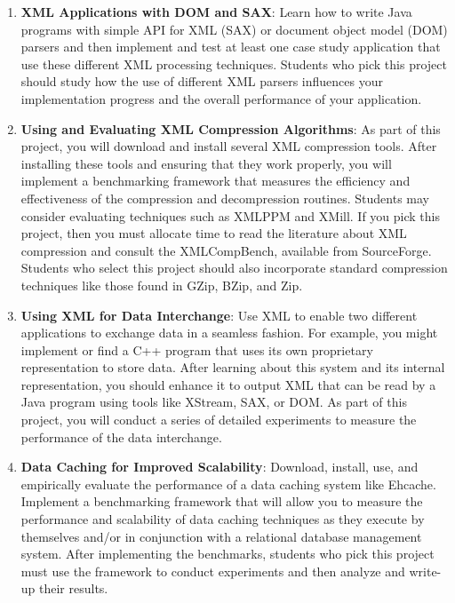 \begin{enumerate}
  \item {\bf XML Applications with DOM and SAX}: Learn how to write Java programs with simple API for XML (SAX) or
    document object model (DOM) parsers and then implement and test at least one case study application that use these
    different XML processing techniques.  Students who pick this project should study how the use of different XML
    parsers influences your implementation progress and the overall performance of your application.  

  \item {\bf Using and Evaluating XML Compression Algorithms}: As part of this project, you will download and install
    several XML compression tools.  After installing these tools and ensuring that they work properly, you will
    implement a benchmarking framework that measures the efficiency and effectiveness of the compression and
    decompression routines.  Students may consider evaluating techniques such as XMLPPM and XMill. If you pick this
    project, then you must allocate time to read the literature about XML compression and consult the XMLCompBench,
    available from SourceForge.  Students who select this project should also incorporate standard compression
    techniques like those found in GZip, BZip, and Zip.

  \item {\bf Using XML for Data Interchange}: Use XML to enable two different applications to exchange data in a
    seamless fashion.  For example, you might implement or find a C++ program that uses its own proprietary
    representation to store data.  After learning about this system and its internal representation, you should enhance
    it to output XML that can be read by a Java program using tools like XStream, SAX, or DOM.  As part of this project,
    you will conduct a series of detailed experiments to measure the performance of the data interchange.  

  \item {\bf Data Caching for Improved Scalability}: Download, install, use, and empirically evaluate the performance of
    a data caching system like Ehcache.  Implement a benchmarking framework that will allow you to measure the
    performance and scalability of data caching techniques as they execute by themselves and/or in conjunction with a
    relational database management system.  After implementing the benchmarks, students who pick this project must use
    the framework to conduct experiments and then analyze and write-up their results.  


\end{enumerate}
